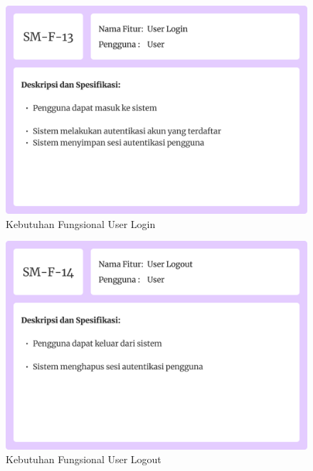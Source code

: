 \begin{figure}[!h]
    \includegraphics[width=1\linewidth, center]{images/hasil/iterations/5/fr-login-user.png}
    \caption{Kebutuhan Fungsional User Login}
    \label{fig:fr-login-user}
\end{figure}

\begin{figure}[!h]
    \includegraphics[width=1\linewidth, center]{images/hasil/iterations/5/fr-logout-user.png}
    \caption{Kebutuhan Fungsional User Logout}
    \label{fig:fr-logout-user}
\end{figure}

